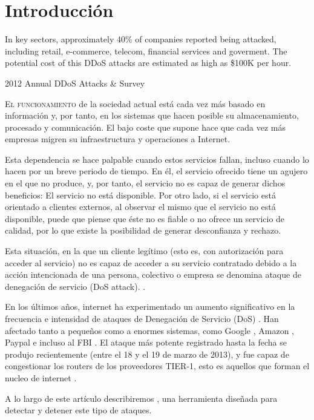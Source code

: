 \chapter{Introducción}\label{introduccion}
\epigraph{In key sectors, approximately 40\% of companies reported being attacked, including retail, 
e-commerce, telecom, financial services and goverment. The potential cost of this DDoS attacks are estimated as 
high as \$100K per hour.}{2012 Annual DDoS Attacks \& Survey}

\lettrine[lraise=-0.1, lines=2, loversize=0.2]{E}{l funcionamiento} de la sociedad actual está cada vez más basado en 
información y, por tanto, en los sistemas que hacen posible su almacenamiento, procesado y comunicación. El bajo coste 
que supone hace que cada vez más empresas migren su infraestructura y operaciones a Internet.

Esta dependencia se hace palpable cuando estos servicios fallan, incluso cuando lo hacen por un breve periodo de tiempo. 
En él, el servicio ofrecido tiene un agujero en el que no produce, y, por tanto, el servicio no es capaz de generar 
dichos beneficios: El servicio no está disponible. Por otro lado, si el servicio está orientado a clientes externos, al 
observar el mismo que el servicio no está disponible, puede que piense que éste no es fiable o no ofrece un servicio 
de calidad, por lo que existe la posibilidad de generar desconfianza y rechazo.

Esta situación, en la que un cliente legítimo (esto es, con autorización para acceder al servicio) no es capaz de 
acceder a su servicio contratado debido a la acción intencionada de una persona, colectivo o empresa se denomina ataque 
de denegación de servicio (DoS attack). \cite{Raghavan}.

En los últimos años, internet ha experimentado un aumento significativo en la frecuencia e intensidad de ataques de 
Denegación de Servicio (DoS) \cite{kakaspersky_2H2011_DDoS_analisis}. Han afectado tanto a pequeños como a enormes 
sistemas, como Google \cite{Google+_DDoS_attack}, Amazon \cite{Amazon_DDoS_attack}, Paypal e incluso al FBI 
\cite{FBI_DDoS_attack}. El ataque más potente registrado hasta la fecha se produjo recientemente (entre el 18 y el 19 de 
marzo de 2013), y fue capaz de congestionar los routers de los proveedores TIER-1, esto es aquellos que
forman el nucleo de internet \cite{spamhaus_DDoS_attack}. 

A lo largo de este artículo describiremos \redborderddos, una herramienta diseñada 
para detectar y detener este tipo de ataques.


\endinput
